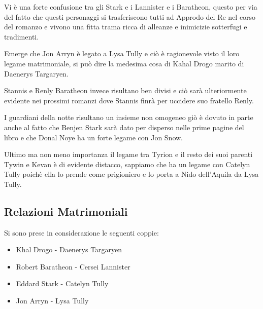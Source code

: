 \documentclass[a4paper]{article}
\begin{document}
Vi è una forte confusione tra gli Stark e i Lannister e i Baratheon, questo per via del fatto che questi personaggi si trasferiscono tutti ad Approdo del Re nel corso del romanzo e vivono una fitta trama ricca di alleanze e inimicizie sotterfugi e tradimenti.

Emerge che Jon Arryn è legato a Lysa Tully e ciò è ragionevole visto il loro legame matrimoniale, si può dire la medesima cosa di Kahal Drogo marito di Daenerys Targaryen.

Stannis e Renly Baratheon invece risultano ben divisi e ciò sarà ulteriormente evidente nei prossimi romanzi dove Stannis finrà per uccidere suo fratello Renly.

I guardiani della notte risultano un insieme non omogeneo giò è dovuto in parte anche al fatto che Benjen Stark sarà dato per disperso nelle prime pagine del libro e che Donal Noye ha un forte legame con Jon Snow.

Ultimo ma non meno importanza il legame tra Tyrion e il resto dei suoi parenti Tywin e Kevan è di evidente distacco, sappiamo che ha un legame con Catelyn Tully poichè ella lo prende come prigioniero e lo porta a Nido dell'Aquila da Lysa Tully.

\subsection{Relazioni Matrimoniali}

Si sono prese in considerazione le seguenti coppie:

\begin{itemize}
\item Khal Drogo - Daenerys Targaryen
\item Robert Baratheon - Cersei Lannister
\item Eddard Stark - Catelyn Tully
\item Jon Arryn - Lysa Tully
\end{itemize}
\end{document}
